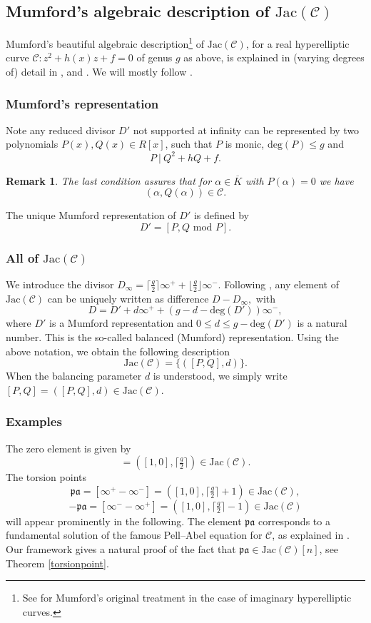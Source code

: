 \documentclass[11pt, a4paper]{amsart}
\newcommand{\jac}{\mathrm{Jac(\mathcal C)}}
\newcommand{\eqst}[1]{\begin{equation*}#1\end{equation*}}
\theoremstyle{plain}
\newtheorem{remark}{Remark}[section]
\numberwithin{equation}{section}
\begin{document}
\subsection{Mumford's algebraic description of $\jac$}
\label{sec-mumford}
Mumford's beautiful algebraic description\footnote{See \cite{mumfordtheta} for Mumford's original treatment in the case of imaginary hyperelliptic curves.} of $\jac$, for a real hyperelliptic curve $\mathcal C : z^2 +h(x) z + f = 0$ of genus $g$ as above, is explained in (varying degrees of) detail in \cite{galbraith}, \cite{comparison} and \cite{wood}. We will mostly follow \cite{galbraith,comparison}. 
\subsubsection{Mumford's representation}
\label{sec-mumford-repr}
Note any reduced divisor $D'$ not supported at infinity can be represented by two polynomials $P(x),Q(x) \in R[x]$, such that $P$ is monic, $\mathrm{deg}(P) \leq g$ and \eqst{P \ \vert \ Q^2 + h Q + f.} 
\begin{remark}The last condition assures that for $\alpha \in \overline K$ with $P(\alpha) = 0$ we have \eqst{(\alpha,Q(\alpha)) \in \mathcal C.}
\end{remark} 
\noindent The unique Mumford representation of $D'$ is defined by \eqst{D' = [P,Q \text{ mod }P] .} 
\subsubsection{All of $\jac$}
We introduce the divisor $D_\infty = \lceil \frac g 2 \rceil \infty ^+ + \lfloor \frac g 2 \rfloor \infty^-$. Following \cite{galbraith}, any element of $\jac$ can be uniquely written as difference $D - D_\infty,$ with \eqst{D = D' + d \infty^+ + (g-d-\mathrm{deg}(D'))\infty^-,} where $D'$ is a Mumford representation and $0 \leq d \leq g-\mathrm{deg}(D')$ is a natural number. This is the so-called balanced (Mumford) representation. Using the above notation, we obtain the following description \eqst{\jac = \{ ([P,Q],d) \}.} When the balancing parameter $d$ is understood, we simply write $[P,Q] = ([P,Q],d) \in \jac$.
\subsubsection{Examples}
\label{sec-mumford-examples}
The zero element is given by \eqst{[0] = ([1,0],\lceil \tfrac g 2 \rceil) \in \jac.} The torsion points \eqst{\mathfrak{pa} = [\infty^+ - \infty^-] = ([1,0],\lceil \tfrac g 2 \rceil + 1) \in \jac,} \eqst{-\mathfrak {pa} = [\infty^- - \infty^+] = ([1,0],\lceil \tfrac g 2 \rceil - 1) \in \jac} will appear prominently in the following. The element $\mathfrak {pa}$ corresponds to a fundamental solution of the famous Pell--Abel equation for $\mathcal C$, as explained in \cite{gendron}. Our framework gives a natural proof of the fact that $\mathfrak {pa} \in \jac[n]$, see Theorem \ref{torsionpoint}.
\end{document}
